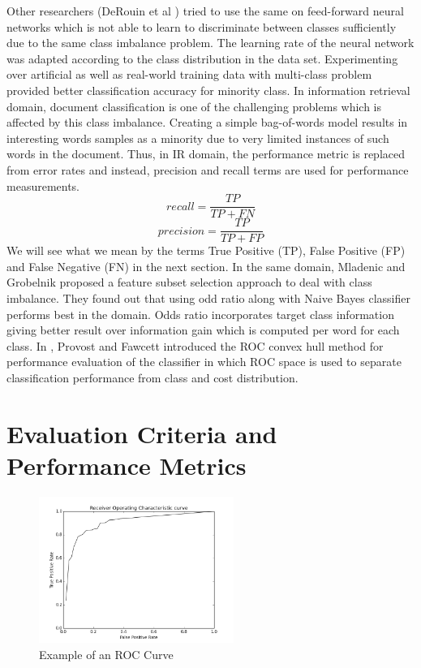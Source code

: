 \documentclass[10pt,journal,compsoc]{IEEEtran}
\begin{document}
Other researchers (DeRouin et al \cite{derouin91}) tried to use the same on feed-forward neural networks which is not able to learn to discriminate between classes sufficiently due to the same class imbalance problem.
The learning rate of the neural network was adapted according to the class distribution in the data set.
Experimenting over artificial as well as real-world training data with multi-class problem provided better classification accuracy for minority class.
In information retrieval domain, document classification is one of the challenging problems which is affected by this class imbalance.
Creating  a simple bag-of-words model results in interesting words samples as a minority due to very limited instances of such words in the document.
Thus, in IR domain, the performance metric is replaced from error rates and instead, precision and recall terms are used for performance measurements.
$$recall = \frac{TP}{TP + FN}$$ $$precision = \frac{TP}{TP + FP}$$
We will see what we mean by the terms True Positive (TP), False Positive (FP) and False Negative (FN) in the next section.
In the same domain, Mladenic and Grobelnik \cite{mg99} proposed a feature subset selection approach to deal with class imbalance.
They found out that using odd ratio along with Naive Bayes classifier performs best in the domain. 
Odds ratio incorporates target class information giving better result over information gain which is computed per word for each class.
In \cite{pf98}, Provost and Fawcett introduced the ROC convex hull method for performance evaluation of the classifier in which ROC space is used to separate classification performance from class and cost distribution. 


\section{Evaluation Criteria and Performance Metrics}
\label{sec:metrics}
\begin{figure}[!b]
	\centering
	\includegraphics[width=2.5in]{code/figures/mammography_ROC}
	\caption{Example of an ROC Curve}
	\label{fig:roc}
\end{figure}
\end{document}
